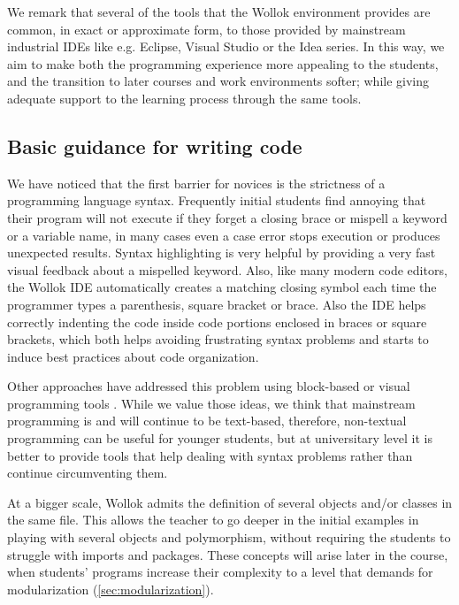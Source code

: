 We remark that several of the tools that the Wollok environment provides are common, in exact or approximate form, to those provided by mainstream industrial IDEs like e.g. Eclipse, Visual Studio or the Idea series. In this way, we aim to make both the programming experience more appealing to the students, and the transition to later courses and work environments softer; while giving adequate support to the learning process through the same tools.

\subsection{Basic guidance for writing code}
We have noticed that the first barrier for novices is the strictness of a programming language syntax. Frequently initial students find annoying that their program will not execute if they forget a closing brace or mispell a keyword or a variable name, in many cases even a case error stops execution or produces unexpected results.
Syntax highlighting is very helpful by providing a very fast visual feedback about a mispelled keyword.
Also, like many modern code editors, the Wollok IDE automatically creates a matching closing symbol each time the programmer types a parenthesis, square bracket or brace. 
Also the IDE helps correctly indenting the code inside code portions enclosed in braces or square brackets, which both helps avoiding frustrating syntax problems and starts to induce best practices about code organization.

Other approaches have addressed this problem using block-based or visual programming tools . 
While we value those ideas, we think that mainstream programming is and will continue to be text-based, therefore, non-textual programming can be useful for younger students, but at universitary level it is better to provide tools that help dealing with syntax problems rather than continue circumventing them.

At a bigger scale, Wollok admits the definition of several objects and/or classes in the same file. 
This allows the teacher to go deeper in the initial examples in playing with several objects and polymorphism, without requiring the students to struggle with imports and packages.
These concepts will arise later in the course, when students' programs increase their complexity to a level that demands for modularization (\cf \ref{sec:modularization}).

